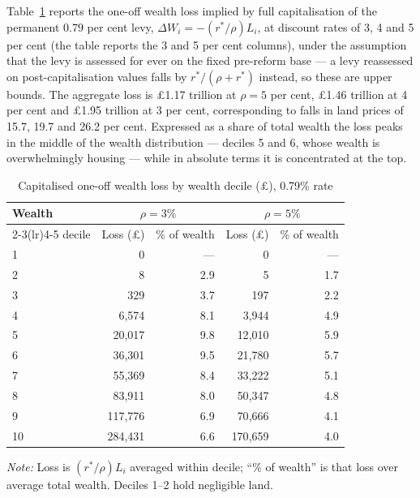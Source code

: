 Table~\ref{tab:capitalisation} reports the one-off wealth loss implied by full capitalisation of the permanent 0.79 per cent levy, $\Delta W_i = -(r^{*}/\rho) L_i$, at discount rates of 3, 4 and 5 per cent (the table reports the 3 and 5 per cent columns), under the assumption that the levy is assessed for ever on the fixed pre-reform base --- a levy reassessed on post-capitalisation values falls by $r^{*}/(\rho+r^{*})$ instead, so these are upper bounds. The aggregate loss is \pounds 1.17 trillion at $\rho=5$ per cent, \pounds 1.46 trillion at 4 per cent and \pounds 1.95 trillion at 3 per cent, corresponding to falls in land prices of 15.7, 19.7 and 26.2 per cent. Expressed as a share of total wealth the loss peaks in the middle of the wealth distribution --- deciles 5 and 6, whose wealth is overwhelmingly housing --- while in absolute terms it is concentrated at the top.

\begin{table}[htbp]
\centering
\caption{Capitalised one-off wealth loss by wealth decile (\pounds), 0.79\% rate}
\label{tab:capitalisation}
\begin{tabular}{lrrrr}
\toprule
Wealth & \multicolumn{2}{c}{$\rho = 3\%$} & \multicolumn{2}{c}{$\rho = 5\%$} \\
\cmidrule(lr){2-3}\cmidrule(lr){4-5}
decile & Loss (\pounds) & \% of wealth & Loss (\pounds) & \% of wealth \\
\midrule
1  & 0           & ---  & 0           & --- \\
2  & 8           & 2.9  & 5           & 1.7 \\
3  & 329         & 3.7  & 197         & 2.2 \\
4  & 6{,}574     & 8.1  & 3{,}944     & 4.9 \\
5  & 20{,}017    & 9.8  & 12{,}010    & 5.9 \\
6  & 36{,}301    & 9.5  & 21{,}780    & 5.7 \\
7  & 55{,}369    & 8.4  & 33{,}222    & 5.1 \\
8  & 83{,}911    & 8.0  & 50{,}347    & 4.8 \\
9  & 117{,}776   & 6.9  & 70{,}666    & 4.1 \\
10 & 284{,}431   & 6.6  & 170{,}659   & 4.0 \\
\bottomrule
\end{tabular}

\medskip
{\footnotesize\emph{Note:} Loss is $(r^{*}/\rho) L_i$ averaged within decile; ``\% of wealth'' is that loss over average total wealth. Deciles 1--2 hold negligible land.}
\end{table}

